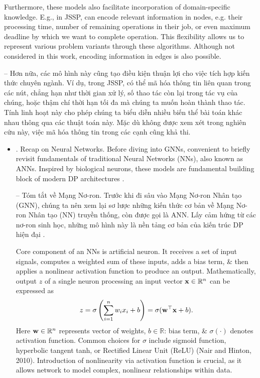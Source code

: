 \documentclass{article}
\begin{document}
\begin{itemize}
    Furthermore, these models also facilitate incorporation of domain-specific knowledge. E.g., in JSSP, can encode relevant information in nodes, e.g. their processing time, number of remaining operations in their job, or even maximum deadline by which we want to complete operation. This flexibility allows us to represent various problem variants through these algorithms. Although not considered in this work, encoding information in edges is also possible.

    -- Hơn nữa, các mô hình này cũng tạo điều kiện thuận lợi cho việc tích hợp kiến thức chuyên ngành. Ví dụ, trong JSSP, có thể mã hóa thông tin liên quan trong các nút, chẳng hạn như thời gian xử lý, số thao tác còn lại trong tác vụ của chúng, hoặc thậm chí thời hạn tối đa mà chúng ta muốn hoàn thành thao tác. Tính linh hoạt này cho phép chúng ta biểu diễn nhiều biến thể bài toán khác nhau thông qua các thuật toán này. Mặc dù không được xem xét trong nghiên cứu này, việc mã hóa thông tin trong các cạnh cũng khả thi.
    \begin{itemize}
        \item {. Recap on Neural Networks.} Before diving into GNNs, convenient to briefly revisit fundamentals of traditional Neural Networks (NNs), also known as ANNs. Inspired by biological neurons, these models are fundamental building block of modern DP architectures \cite{LeCun_Bengio_Hinton2015}.

        -- {\sf Tóm tắt về Mạng Nơ-ron.} Trước khi đi sâu vào Mạng Nơ-ron Nhân tạo (GNN), chúng ta nên xem lại sơ lược những kiến thức cơ bản về Mạng Nơ-ron Nhân tạo (NN) truyền thống, còn được gọi là ANN. Lấy cảm hứng từ các nơ-ron sinh học, những mô hình này là nền tảng cơ bản của kiến trúc DP hiện đại \cite{LeCun_Bengio_Hinton2015}.

        Core component of an NNs is artificial neuron. It receives a set of input signals, computes a weighted sum of these inputs, adds a bias term, \& then applies a nonlinear activation function to produce an output. Mathematically, output $z$ of a single neuron processing an input vector ${\bf x}\in\mathbb{R}^n$ can be expressed as
        \begin{equation*}
            z = \sigma\left(\sum_{i=1}^n w_ix_i + b\right) = \sigma({\bf w}^\top{\bf x} + b).
        \end{equation*}
        Here ${\bf w}\in\mathbb{R}^n$ represents vector of weights, $b\in\mathbb{R}$: bias term, \& $\sigma(\cdot)$ denotes activation function. Common choices for $\sigma$ include sigmoid function, hyperbolic tangent tanh, or Rectified Linear Unit (ReLU) (Nair and Hinton, 2010). Introduction of nonlinearity via activation function is crucial, as it allows network to model complex, nonlinear relationships within data.


\end{itemize}
\end{itemize}
\end{document}
